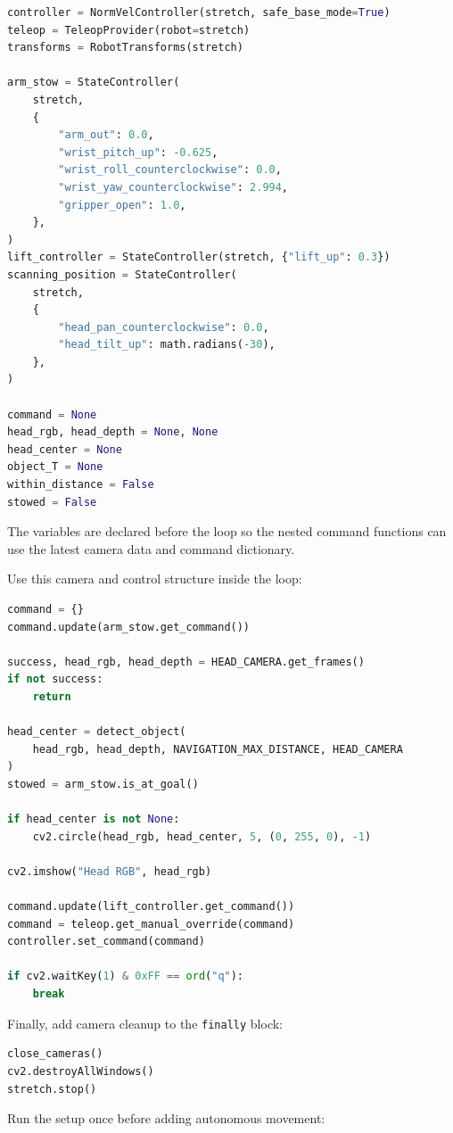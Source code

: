 \documentclass[11pt,a4paper]{article}
\begin{document}
\begin{lstlisting}[language=Python]
controller = NormVelController(stretch, safe_base_mode=True)
teleop = TeleopProvider(robot=stretch)
transforms = RobotTransforms(stretch)

arm_stow = StateController(
    stretch,
    {
        "arm_out": 0.0,
        "wrist_pitch_up": -0.625,
        "wrist_roll_counterclockwise": 0.0,
        "wrist_yaw_counterclockwise": 2.994,
        "gripper_open": 1.0,
    },
)
lift_controller = StateController(stretch, {"lift_up": 0.3})
scanning_position = StateController(
    stretch,
    {
        "head_pan_counterclockwise": 0.0,
        "head_tilt_up": math.radians(-30),
    },
)

command = None
head_rgb, head_depth = None, None
head_center = None
object_T = None
within_distance = False
stowed = False
\end{lstlisting}

The variables are declared before the loop so the nested command functions
can use the latest camera data and command dictionary.

Use this camera and control structure inside the loop:

\begin{lstlisting}[language=Python]
command = {}
command.update(arm_stow.get_command())

success, head_rgb, head_depth = HEAD_CAMERA.get_frames()
if not success:
    return

head_center = detect_object(
    head_rgb, head_depth, NAVIGATION_MAX_DISTANCE, HEAD_CAMERA
)
stowed = arm_stow.is_at_goal()

if head_center is not None:
    cv2.circle(head_rgb, head_center, 5, (0, 255, 0), -1)

cv2.imshow("Head RGB", head_rgb)

command.update(lift_controller.get_command())
command = teleop.get_manual_override(command)
controller.set_command(command)

if cv2.waitKey(1) & 0xFF == ord("q"):
    break
\end{lstlisting}

Finally, add camera cleanup to the \texttt{finally} block:

\begin{lstlisting}[language=Python]
close_cameras()
cv2.destroyAllWindows()
stretch.stop()
\end{lstlisting}

Run the setup once before adding autonomous movement:
\end{document}
